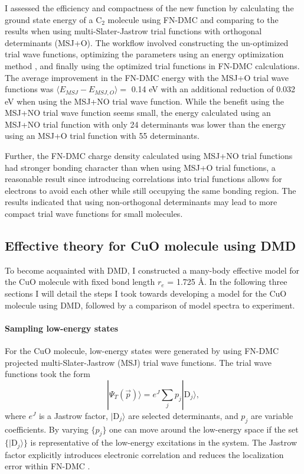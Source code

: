 \documentclass[12pt]{article}
\begin{document}
I assessed the efficiency and compactness of the new function by calculating the ground state energy of a C$_2$ molecule using FN-DMC and comparing to the results when using multi-Slater-Jastrow trial functions with orthogonal determinants (MSJ+O). 
The workflow involved constructing the un-optimized trial wave functions, optimizing the parameters using an energy optimization method \cite{Toulouse2007}, and finally using the optimized trial functions in FN-DMC calculations. 
The average improvement in the FN-DMC energy with the MSJ+O trial wave functions was $\langle E_{MSJ} - E_{MSJ,O}\rangle =$ 0.14 eV with an additional reduction of 0.032 eV when using the MSJ+NO trial wave function.
While the benefit using the MSJ+NO trial wave function seems small, the energy calculated using an MSJ+NO trial function with only 24 determinants was lower than the energy using an MSJ+O trial 
function with 55 determinants.

Further, the FN-DMC charge density calculated using MSJ+NO trial functions had stronger bonding character than when using MSJ+O trial functions, a reasonable result since introducing correlations into trial functions allows for electrons to avoid each other while still occupying the same bonding region. 
The results indicated that using non-orthogonal determinants may lead to more compact trial wave functions for small molecules.

\subsection{Effective theory for CuO molecule using DMD}
To become acquainted with DMD, I constructed a many-body effective model for the CuO molecule with fixed bond length $r_e$ = 1.725 \r{A}.
In the following three sections I will detail the steps I took towards developing a model for the CuO molecule using DMD, followed by a comparison of model spectra to experiment.

\vspace{-10pt}
\paragraph{Sampling low-energy states}
For the CuO molecule, low-energy states were generated by using FN-DMC projected multi-Slater-Jastrow (MSJ) trial wave functions.
The trial wave functions took the form
\begin{equation}
|\Psi_T(\vec{p}) \rangle =  e^{J}\sum_{j} p_j|\text{D}_j\rangle,
\label{eq:sampling}
\end{equation}
where $e^J$ is a Jastrow factor, $|\text{D}_j\rangle$ are selected determinants, and $p_j$ are variable coefficients.
By varying $\{p_j\}$ one can move around the low-energy space if the set $\{|\text{D}_j \rangle\}$ is representative of the low-energy excitations in the system.
The Jastrow factor explicitly introduces electronic correlation and reduces the localization error within FN-DMC \cite{Foulkes2001}.
\end{document}
